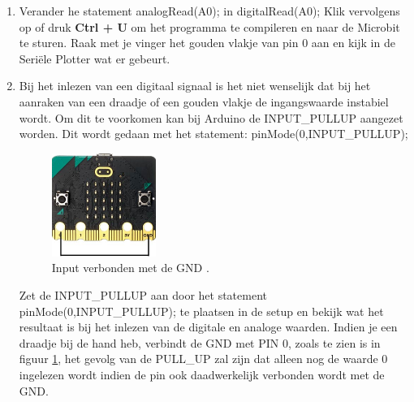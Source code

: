 \begin{enumerate}
\begin{enumerate}
\end{enumerate}


\item Verander he statement  \textcolor{arduinoOrange}{analogRead}(A0); in \textcolor{arduinoOrange}{digitalRead}(A0); Klik vervolgens op  of druk \colorbox{mygray}{\textbf{Ctrl + U}} om het programma te compileren en naar de Microbit te sturen. Raak met je vinger het gouden vlakje van pin 0 aan en kijk in de Seriële Plotter wat er gebeurt. 

\item Bij het inlezen van een digitaal signaal is het niet wenselijk dat bij het aanraken van een draadje of een gouden vlakje de ingangswaarde instabiel wordt. Om dit te voorkomen kan bij Arduino de  \textcolor{arduinoBlue}{INPUT\_PULLUP} aangezet worden. Dit wordt gedaan met het statement: \textcolor{arduinoOrange}{pinMode}(0,\textcolor{arduinoBlue}{INPUT\_PULLUP}); 

\begin{minipage}{\linewidth}
\begin{figure}
	\vspace{-15pt}
	\begin{center}
		\centering
		\captionsetup{justification=centering}
		\includegraphics[width=0.32\textwidth]{figuren/microBitDraad}
	\end{center}
	\caption{Input verbonden met de GND .}
	\label{fig:micrDraad}
\end{figure}
Zet de \textcolor{arduinoBlue}{INPUT\_PULLUP} aan door het statement 
\textcolor{arduinoOrange}{pinMode}(0,\textcolor{arduinoBlue}{INPUT\_PULLUP});  
te plaatsen in de \textcolor{arduinoGreen}{setup} en bekijk wat het resultaat is bij het inlezen van de digitale en analoge waarden. Indien je een draadje bij de hand heb, verbindt de GND met PIN 0, zoals te zien is in figuur \ref{fig:micrDraad}, het gevolg van de PULL\_UP zal zijn dat alleen nog de waarde 0 ingelezen wordt indien de pin ook daadwerkelijk verbonden wordt met de GND.
\end{minipage}

\end{enumerate}
